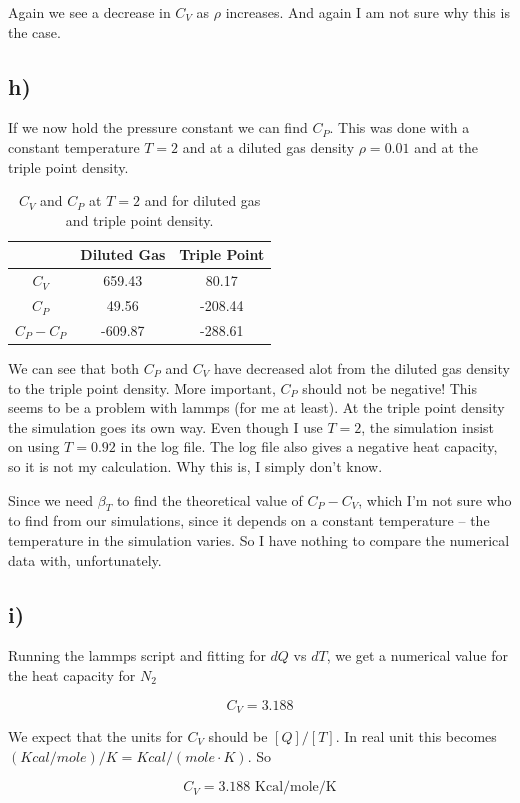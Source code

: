 \documentclass[a4paper,norsk, 10pt]{article}
\begin{document}
Again we see a decrease in $C_V$ as $\rho$ increases. And again I am not sure why this is the case.

\subsection{h)}
If we now hold the pressure constant we can find $C_P$. This was done with a constant temperature $T=2$ and at a diluted gas density $\rho = 0.01$ and at the triple point density.

\begin{table}[H]
\centering
\begin{tabular}{c|c|c}
& Diluted Gas & Triple Point\\
\hline
$C_V$ & 659.43 & 80.17\\
$C_P$ & 49.56 & -208.44\\
$C_P - C_P$ & -609.87 & -288.61
\end{tabular}
\caption{$C_V$ and $C_P$ at $T=2$ and for diluted gas and triple point density.}
\end{table}

We can see that both $C_P$ and $C_V$ have decreased alot from the diluted gas density to the triple point density. More important, $C_P$ should not be negative! This seems to be a problem with lammps (for me at least). At the triple point density the simulation goes its own way. Even though I use $T=2$, the simulation insist on using $T=0.92$ in the log file. The log file also gives a negative heat capacity, so it is not my calculation. Why this is, I simply don't know.

Since we need $\beta_T$ to find the theoretical value of $C_P - C_V$, which I'm not sure who to find from our simulations, since it depends on a constant temperature -- the temperature in the simulation varies. So I have nothing to compare the numerical data with, unfortunately.

\subsection{i)}
Running the lammps script and fitting for $dQ$ vs $dT$, we get a numerical value for the heat capacity for $N_2$

\begin{equation}
C_V = 3.188
\end{equation}

We expect that the units for $C_V$ should be $[Q]/[T]$. In real unit this becomes $(Kcal/mole)/K = Kcal/(mole\cdot K)$. So

\begin{equation}
C_V = 3.188 \text{ Kcal/mole/K}
\end{equation}
\end{document}
